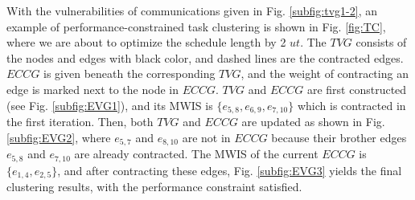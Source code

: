 \documentclass[10pt,journal, compsoc]{IEEEtran}
\begin{document}
With the vulnerabilities of communications given in Fig. \ref{subfig:tvg1-2}, an example of performance-constrained task clustering is shown in Fig. \ref{fig:TC}, where we are about to optimize the schedule length by 2 $ut$. The $TVG$ consists of the nodes and edges with black color, and dashed lines are the contracted edges. $ECCG$ is given beneath the corresponding $TVG$, and the weight of contracting an edge is marked next to the node in $ECCG$. $TVG$ and $ECCG$ are first constructed (see Fig. \ref{subfig:EVG1}), and its MWIS is $\{e_{5,8}, e_{6,9}, e_{7,10}\}$ which is contracted in the first iteration. Then, both $TVG$ and $ECCG$ are updated as shown in Fig. \ref{subfig:EVG2}, where $e_{5,7}$ and $e_{8,10}$ are not in $ECCG$ because their brother edges $e_{5,8}$ and $e_{7,10}$ are already contracted. The MWIS of the current $ECCG$ is $\{e_{1,4}, e_{2,5}\}$, and after contracting these edges, Fig. \ref{subfig:EVG3} yields the final clustering results, with the performance constraint satisfied.%
\end{document}
